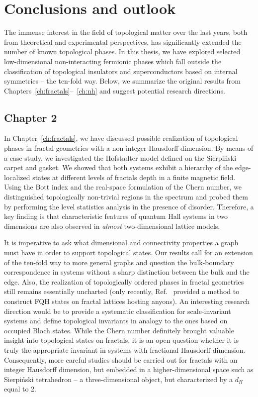 \chapter{Conclusions and outlook}
\label{ch:summary}
 
The immense interest in the field of topological matter over the last years, both from theoretical and experimental perspectives, has significantly extended the number of known topological phases. In this thesis, we have explored selected low-dimensional non-interacting fermionic phases which fall outside the classification of topological insulators and superconductors based on internal symmetries -- the ten-fold way. Below, we summarize the original results from Chapters~\ref{ch:fractals}--~\ref{ch:nh} and suggest potential research directions.

\section*{Chapter 2}
\noindent In Chapter~\ref{ch:fractals}, we have discussed possible realization of topological phases in fractal geometries with a non-integer Hausdorff dimension. By means of a case study, we investigated the Hofstadter model defined on the Sierpiński carpet and gasket. We showed that both systems exhibit a hierarchy of the edge-localized states at different levels of fractals depth in a finite magnetic field. Using the Bott index and the real-space formulation of the Chern number, we distinguished topologically non-trivial regions in the spectrum and probed them by performing the level statistics analysis in the presence of disorder. Therefore, a key finding is that characteristic features of quantum Hall systems in two dimensions are also observed in \emph{almost} two-dimensional lattice models.

It is imperative to ask what dimensional and connectivity properties a graph must have in order to support topological states. Our results call for an extension of the ten-fold way to more general graphs and question the bulk-boundary correspondence in systems without a sharp distinction between the bulk and the edge. Also, the realization of topologically ordered phases in fractal geometries still remains essentially uncharted (only recently, Ref.~\cite{manna2019anyons} provided a method to construct FQH states on fractal lattices hosting anyons). An interesting research direction would be to provide a systematic classification for scale-invariant systems and define topological invariants in analogy to the ones based on occupied Bloch states. While the Chern number definitely brought valuable insight into topological states on fractals, it is an open question whether it is truly the appropriate invariant in systems with fractional Hausdorff dimension. Consequently, more careful studies should be carried out for fractals with an integer Hausdorff dimension, but embedded in a higher-dimensional space such as Sierpiński tetrahedron -- a three-dimensional object, but characterized by a $d_H$ equal to 2.


